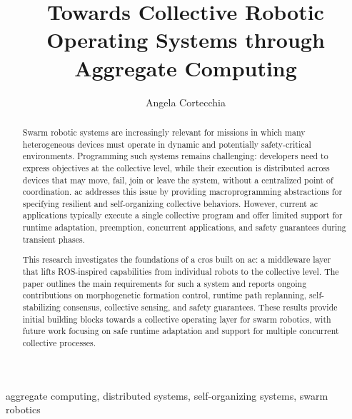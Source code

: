 \documentclass[conference]{IEEEtran}
\begin{document}
\title{Towards Collective Robotic Operating Systems through Aggregate Computing\\
}

\author{Angela Cortecchia\\
}

\maketitle

\begin{abstract}
Swarm robotic systems are increasingly relevant for missions in which many heterogeneous devices must operate in dynamic and potentially safety-critical environments.
%
Programming such systems remains challenging:
developers need to express objectives at the collective level,
while their execution is distributed across devices that may move,
fail, join or leave the system,
without a centralized point of coordination.
%
\acl{ac} addresses this issue by providing macroprogramming abstractions for specifying resilient and self-organizing collective behaviors.
%
However,
current \acl{ac} applications typically execute a single collective program and offer limited support for runtime adaptation,
preemption, concurrent applications, and safety guarantees during transient phases.

This research investigates the foundations of a \acl{cros} built on \acl{ac}:
a middleware layer that lifts ROS-inspired capabilities from individual robots to the collective level.
%
The paper outlines the main requirements for such a system and reports ongoing contributions on morphogenetic formation control,
runtime path replanning, self-stabilizing consensus, collective sensing, and safety guarantees.
%
These results provide initial building blocks towards a collective operating layer for swarm robotics,
with future work focusing on safe runtime adaptation and support for multiple concurrent collective processes.
\end{abstract}

\begin{IEEEkeywords}
aggregate computing, distributed systems, self-organizing systems, swarm robotics
\end{IEEEkeywords}
\end{document}
